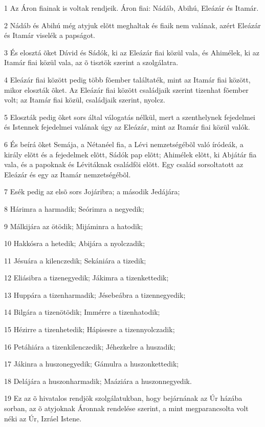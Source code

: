 \par 1 Az Áron fiainak is voltak rendjeik. Áron fiai: Nádáb, Abihú, Eleázár és Itamár.
\par 2 Nádáb és Abihú még atyjuk elõtt meghaltak és fiaik nem valának, azért Eleázár és Itamár viselék a papságot.
\par 3 És elosztá õket Dávid és Sádók, ki az Eleázár fiai közül vala, és Ahimélek, ki az Itamár fiai közül vala, az õ tisztök szerint a szolgálatra.
\par 4 Eleázár fiai között pedig több fõember találtaték, mint az Itamár fiai között, mikor eloszták õket. Az Eleázár fiai között családjaik szerint tizenhat fõember volt; az Itamár fiai közül, családjaik szerint, nyolcz.
\par 5 Eloszták pedig õket sors által válogatás nélkül, mert a szenthelynek fejedelmei és Istennek fejedelmei valának úgy az Eleázár, mint az Itamár fiai közül valók.
\par 6 És beírá õket Semája, a Nétanéel fia, a Lévi nemzetségébõl való íródeák, a király elõtt és a fejedelmek elõtt, Sádók pap elõtt; Ahimélek elõtt, ki Abjátár fia vala, és a papoknak és Lévitáknak családfõi elõtt. Egy család sorsoltatott az Eleázár és egy az Itamár nemzetségébõl.
\par 7 Esék pedig az elsõ sors Jojáribra; a második Jedájára;
\par 8 Hárimra a harmadik; Seórimra a negyedik;
\par 9 Málkijára az ötödik; Mijáminra a hatodik;
\par 10 Hakkósra a hetedik; Abijára a nyolczadik;
\par 11 Jésuára a kilenczedik; Sekániára a tizedik;
\par 12 Eliásibra a tizenegyedik; Jákimra a tizenkettedik;
\par 13 Huppára a tizenharmadik; Jésebeábra a tizennegyedik;
\par 14 Bilgára a tizenötödik; Immérre a tizenhatodik;
\par 15 Hézirre a tizenhetedik; Hápisesre a tizennyolczadik;
\par 16 Petáhiára a tizenkilenczedik; Jéhezkelre a huszadik;
\par 17 Jákinra a huszonegyedik; Gámulra a huszonkettedik;
\par 18 Delájára a huszonharmadik; Maáziára a huszonnegyedik.
\par 19 Ez az õ hivatalos rendjök szolgálatukban, hogy bejárnának az Úr házába sorban, az õ atyjoknak Áronnak rendelése szerint, a mint megparancsolta volt néki az Úr, Izráel Istene.

